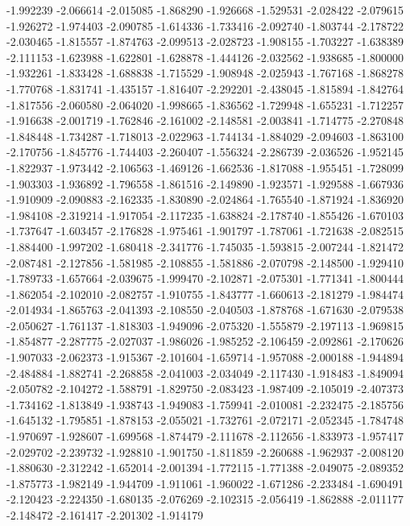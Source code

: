 -1.992239
-2.066614
-2.015085
-1.868290
-1.926668
-1.529531
-2.028422
-2.079615
-1.926272
-1.974403
-2.090785
-1.614336
-1.733416
-2.092740
-1.803744
-2.178722
-2.030465
-1.815557
-1.874763
-2.099513
-2.028723
-1.908155
-1.703227
-1.638389
-2.111153
-1.623988
-1.622801
-1.628878
-1.444126
-2.032562
-1.938685
-1.800000
-1.932261
-1.833428
-1.688838
-1.715529
-1.908948
-2.025943
-1.767168
-1.868278
-1.770768
-1.831741
-1.435157
-1.816407
-2.292201
-2.438045
-1.815894
-1.842764
-1.817556
-2.060580
-2.064020
-1.998665
-1.836562
-1.729948
-1.655231
-1.712257
-1.916638
-2.001719
-1.762846
-2.161002
-2.148581
-2.003841
-1.714775
-2.270848
-1.848448
-1.734287
-1.718013
-2.022963
-1.744134
-1.884029
-2.094603
-1.863100
-2.170756
-1.845776
-1.744403
-2.260407
-1.556324
-2.286739
-2.036526
-1.952145
-1.822937
-1.973442
-2.106563
-1.469126
-1.662536
-1.817088
-1.955451
-1.728099
-1.903303
-1.936892
-1.796558
-1.861516
-2.149890
-1.923571
-1.929588
-1.667936
-1.910909
-2.090883
-2.162335
-1.830890
-2.024864
-1.765540
-1.871924
-1.836920
-1.984108
-2.319214
-1.917054
-2.117235
-1.638824
-2.178740
-1.855426
-1.670103
-1.737647
-1.603457
-2.176828
-1.975461
-1.901797
-1.787061
-1.721638
-2.082515
-1.884400
-1.997202
-1.680418
-2.341776
-1.745035
-1.593815
-2.007244
-1.821472
-2.087481
-2.127856
-1.581985
-2.108855
-1.581886
-2.070798
-2.148500
-1.929410
-1.789733
-1.657664
-2.039675
-1.999470
-2.102871
-2.075301
-1.771341
-1.800444
-1.862054
-2.102010
-2.082757
-1.910755
-1.843777
-1.660613
-2.181279
-1.984474
-2.014934
-1.865763
-2.041393
-2.108550
-2.040503
-1.878768
-1.671630
-2.079538
-2.050627
-1.761137
-1.818303
-1.949096
-2.075320
-1.555879
-2.197113
-1.969815
-1.854877
-2.287775
-2.027037
-1.986026
-1.985252
-2.106459
-2.092861
-2.170626
-1.907033
-2.062373
-1.915367
-2.101604
-1.659714
-1.957088
-2.000188
-1.944894
-2.484884
-1.882741
-2.268858
-2.041003
-2.034049
-2.117430
-1.918483
-1.849094
-2.050782
-2.104272
-1.588791
-1.829750
-2.083423
-1.987409
-2.105019
-2.407373
-1.734162
-1.813849
-1.938743
-1.949083
-1.759941
-2.010081
-2.232475
-2.185756
-1.645132
-1.795851
-1.878153
-2.055021
-1.732761
-2.072171
-2.052345
-1.784748
-1.970697
-1.928607
-1.699568
-1.874479
-2.111678
-2.112656
-1.833973
-1.957417
-2.029702
-2.239732
-1.928810
-1.901750
-1.811859
-2.260688
-1.962937
-2.008120
-1.880630
-2.312242
-1.652014
-2.001394
-1.772115
-1.771388
-2.049075
-2.089352
-1.875773
-1.982149
-1.944709
-1.911061
-1.960022
-1.671286
-2.233484
-1.690491
-2.120423
-2.224350
-1.680135
-2.076269
-2.102315
-2.056419
-1.862888
-2.011177
-2.148472
-2.161417
-2.201302
-1.914179

